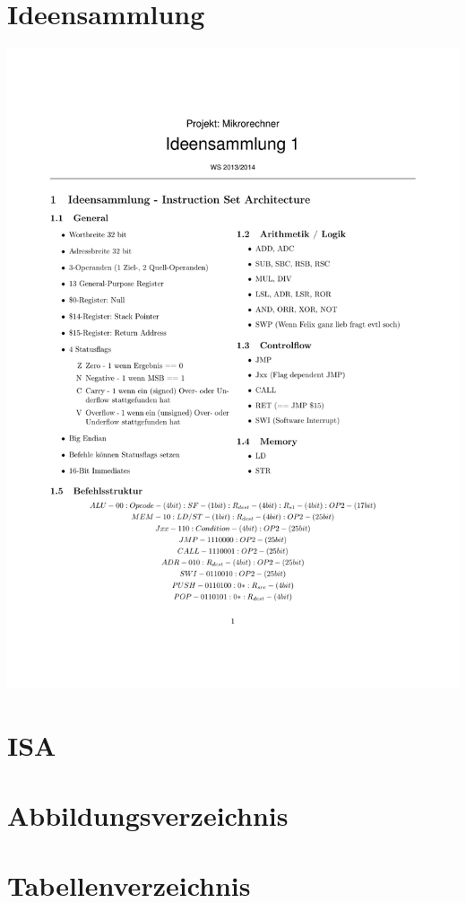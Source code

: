 \section{Ideensammlung}
\begin{center}
\includegraphics[width=\textwidth]{images/Ideensammlung.pdf}
\end{center}
\section{ISA}


\section{Abbildungsverzeichnis}
\listoffigures 

\section{Tabellenverzeichnis}
\listoftables


